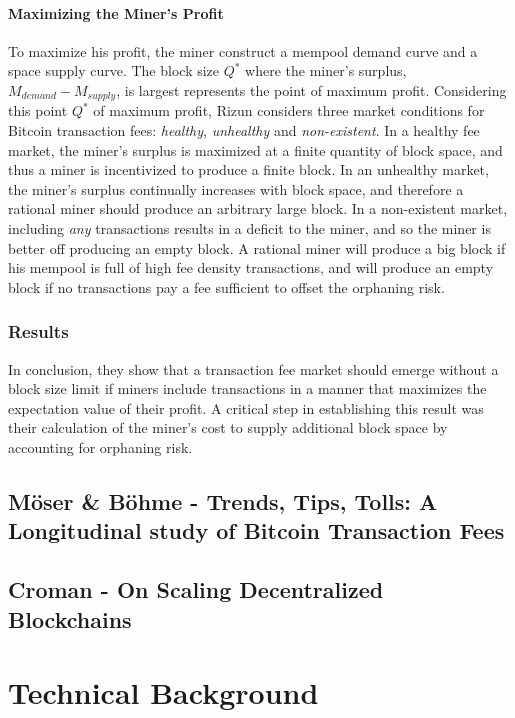 \documentclass[USenglish]{uit-thesis}
\begin{document}
\subsubsection{Maximizing the Miner's Profit}
To maximize his profit, the miner construct a mempool
demand curve and a space supply curve.
The block size $Q^*$ where the miner's surplus,
$M_{demand} - M_{supply}$, is largest represents
the point of maximum profit. Considering this point $Q^*$ of maximum
profit, Rizun considers three market conditions for Bitcoin transaction
fees: \emph{healthy}, \emph{unhealthy} and \emph{non-existent}.
In a healthy fee market, the miner's surplus is maximized
at a finite quantity of block space, and thus a miner is
incentivized to produce a finite block. In an unhealthy
market, the miner's surplus continually increases with
block space, and therefore a rational miner should produce
an arbitrary large block. In a non-existent market,
including \emph{any} transactions results in a deficit
to the miner, and so the miner is better off
producing an empty block. A rational
miner will produce a big block if his mempool
is full of high fee density transactions, and
will produce an empty block if no transactions pay a fee sufficient
to offset the orphaning risk.

\subsection{Results}
In conclusion, they show that a transaction fee market should
emerge without a block size limit if miners
include transactions in a manner that maximizes
the expectation value of their profit. A
critical step in establishing this result was their
calculation of the miner’s cost to supply
additional block space by accounting for orphaning risk.

\section{Möser \& Böhme - Trends, Tips, Tolls: A Longitudinal
study of Bitcoin Transaction Fees}
\label{sec:moser}

\section{Croman - On Scaling Decentralized Blockchains}
\label{sec:croman}

\chapter{Technical Background}
\label{chap:techback}
\end{document}
